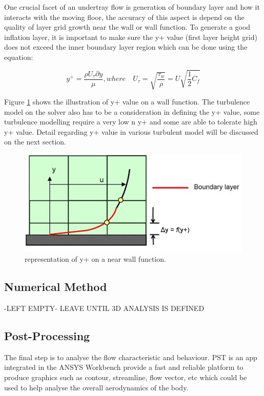 \noindent One crucial facet of an undertray flow is generation of boundary layer and how it interacts with the moving floor, the accuracy of this aspect is depend on the quality of layer grid growth near the wall or wall function. To generate a good inflation layer, it is important to make sure the y+ value (first layer height grid) does not exceed the inner boundary layer region which can be done using the equation:

\begin{equation}
    y^+ = \frac{\rho U_\tau \partial y}{\mu}, where \quad U_\tau = \sqrt{\frac{\tau_w}{\rho}} = U \sqrt{\frac{1}{2}C_f}
\end{equation}

\noindent Figure \ref{fig:inflation layer} shows the illustration of y+ value on a wall function. The turbulence model on the solver also has to be a consideration in defining the y+ value, some turbulence modelling require a very low n y+ and some are able to tolerate high y+ value. Detail regarding y+ value in various turbulent model will be discussed on the next section. 

\begin{figure}[!ht]
    \centering
    \includegraphics{Figures/inflation_layer.jpg}
    \caption{representation of y+ on a near wall function\cite{Inflate4Zealand}.}
    \label{fig:inflation layer}
\end{figure}



\subsection{Numerical Method}
-LEFT EMPTY-
LEAVE UNTIL 3D ANALYSIS IS DEFINED

\subsection{Post-Processing}
The final step is to analyse the flow characteristic and behaviour. PST is an app integrated in the ANSYS Workbench provide a fast and reliable platform to produce graphics such as contour, streamline, flow vector, etc which could be used to help analyse the overall aerodynamics of the body. 

